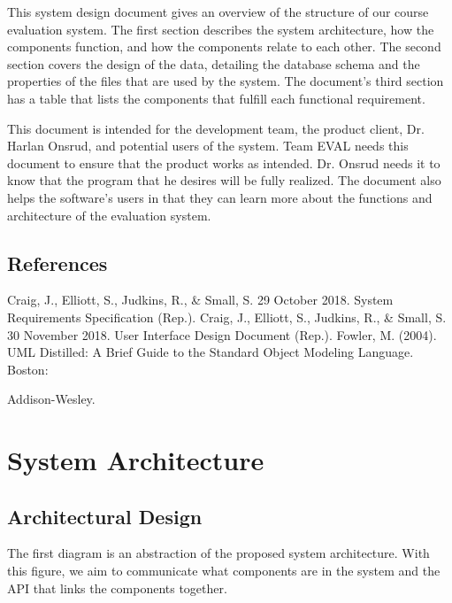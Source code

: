 \documentclass{article}
\begin{document}
This system design document gives an overview of the structure of our course evaluation system. The first section describes the system architecture, how the components function, and how the components relate to each other. The second section covers the design of the data, detailing the database schema and the properties of the files that are used by the system. The document's third section has a table that lists the components that fulfill each functional requirement.

This document is intended for the development team, the product client, Dr. Harlan Onsrud, and potential users of the system. Team EVAL needs this document to ensure that the product works as intended. Dr. Onsrud needs it to know that the program that he desires will be fully realized. The document also helps the software's users in that they can learn more about the functions and architecture of the evaluation system.

\subsection{References}

Craig, J., Elliott, S., Judkins, R., \& Small, S. 29 October 2018. System Requirements Specification (Rep.).
\vspace{3mm}\newline
Craig, J., Elliott, S., Judkins, R., \& Small, S. 30 November 2018. User Interface Design Document (Rep.).
\vspace{3mm}\newline
Fowler, M. (2004). UML Distilled: A Brief Guide to the Standard Object Modeling Language. Boston:

Addison-Wesley.

\section{System Architecture}
\subsection{Architectural Design}

The first diagram is an abstraction of the proposed system architecture. With this figure, we aim to communicate what components are in the system and the API that links the components together.
\end{document}
